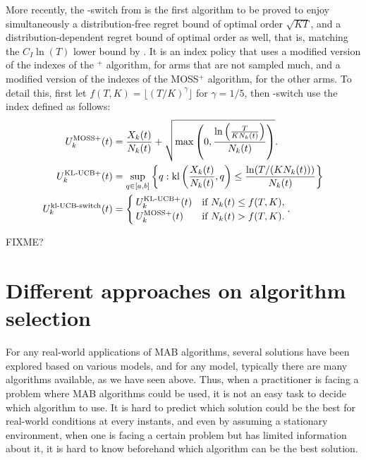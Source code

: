 More recently, the \klUCB-switch from \cite{Garivier18} is the first algorithm to be proved to
enjoy simultaneously a distribution-free regret bound of optimal order $\sqrt{KT}$, and a distribution-dependent regret bound of optimal order as well, that is, matching the $C_I \ln(T)$ lower bound by \cite{LaiRobbins85}.
It is an index policy that uses a modified version of the indexes of the \klUCB$^+$ algorithm, for arms that are not sampled much, and a modified version of the indexes of the MOSS$^+$ algorithm, for the other arms.
To detail this, first let $f(T, K) = \lfloor (T/K)^{\gamma}\rfloor$ for $\gamma=1/5$,
then \klUCB-switch use the index defined as follows:
%
\begin{align}\label{eq:2:indexes_for_klUCBswitch}
    U^{\mathrm{MOSS}+}_k(t) &= \frac{X_k(t)}{N_k(t)} + \sqrt{\max\left(0, \frac{\ln\left(\frac{T}{K N_k(t)}\right)}{N_k(t)}\right)}. \\
    U^{\mathrm{KL}\text{-}\mathrm{UCB}+}_k(t) &= \sup\limits_{q \in [a, b]} \left\{ q : \mathrm{kl}\left(\frac{X_k(t)}{N_k(t)}, q\right) \leq \frac{\ln(T / (K N_k(t)))}{N_k(t)} \right\} \\
    U^{\mathrm{kl}\text{-}\mathrm{UCB}\text{-}\mathrm{switch}}_k(t) &= \begin{cases}
        U^{\mathrm{KL}\text{-}\mathrm{UCB}+}_k(t) & \text{if } N_k(t) \leq f(T, K), \\
        U^{\mathrm{MOSS}+}_k(t) & \text{if } N_k(t) > f(T, K).
    \end{cases}.
\end{align}




FIXME?


\section{Different approaches on algorithm selection}
\label{sec:2:chooseYourPreferredBanditAlgorithm}

For any real-world applications of MAB algorithms,
several solutions have been explored based on various models, and for any model, typically there are many algorithms available, as we have seen above.
%
Thus, when a practitioner is facing a problem where MAB algorithms could be used, it is not an easy task to decide which algorithm to use.
It is hard to predict which solution could be the best for real-world conditions at every instants,
and even by assuming a stationary environment, when one is facing a certain problem but has limited information about it, it is hard to know beforehand which algorithm can be the best solution.

